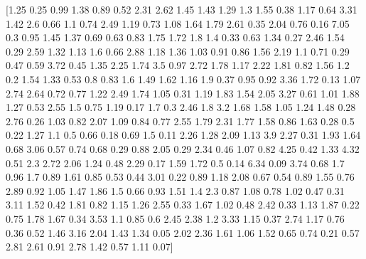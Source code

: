 \documentclass[preview]{standalone}
\begin{document}
\begin{center}
[1.25 0.25 0.99 1.38 0.89 0.52 2.31 2.62 1.45 1.43 1.29 1.3  1.55 0.38
 1.17 0.64 3.31 1.42 2.6  0.66 1.1  0.74 2.49 1.19 0.73 1.08 1.64 1.79
 2.61 0.35 2.04 0.76 0.16 7.05 0.3  0.95 1.45 1.37 0.69 0.63 0.83 1.75
 1.72 1.8  1.4  0.33 0.63 1.34 0.27 2.46 1.54 0.29 2.59 1.32 1.13 1.6
 0.66 2.88 1.18 1.36 1.03 0.91 0.86 1.56 2.19 1.1  0.71 0.29 0.47 0.59
 3.72 0.45 1.35 2.25 1.74 3.5  0.97 2.72 1.78 1.17 2.22 1.81 0.82 1.56
 1.2  0.2  1.54 1.33 0.53 0.8  0.83 1.6  1.49 1.62 1.16 1.9  0.37 0.95
 0.92 3.36 1.72 0.13 1.07 2.74 2.64 0.72 0.77 1.22 2.49 1.74 1.05 0.31
 1.19 1.83 1.54 2.05 3.27 0.61 1.01 1.88 1.27 0.53 2.55 1.5  0.75 1.19
 0.17 1.7  0.3  2.46 1.8  3.2  1.68 1.58 1.05 1.24 1.48 0.28 2.76 0.26
 1.03 0.82 2.07 1.09 0.84 0.77 2.55 1.79 2.31 1.77 1.58 0.86 1.63 0.28
 0.5  0.22 1.27 1.1  0.5  0.66 0.18 0.69 1.5  0.11 2.26 1.28 2.09 1.13
 3.9  2.27 0.31 1.93 1.64 0.68 3.06 0.57 0.74 0.68 0.29 0.88 2.05 0.29
 2.34 0.46 1.07 0.82 4.25 0.42 1.33 4.32 0.51 2.3  2.72 2.06 1.24 0.48
 2.29 0.17 1.59 1.72 0.5  0.14 6.34 0.09 3.74 0.68 1.7  0.96 1.7  0.89
 1.61 0.85 0.53 0.44 3.01 0.22 0.89 1.18 2.08 0.67 0.54 0.89 1.55 0.76
 2.89 0.92 1.05 1.47 1.86 1.5  0.66 0.93 1.51 1.4  2.3  0.87 1.08 0.78
 1.02 0.47 0.31 3.11 1.52 0.42 1.81 0.82 1.15 1.26 2.55 0.33 1.67 1.02
 0.48 2.42 0.33 1.13 1.87 0.22 0.75 1.78 1.67 0.34 3.53 1.1  0.85 0.6
 2.45 2.38 1.2  3.33 1.15 0.37 2.74 1.17 0.76 0.36 0.52 1.46 3.16 2.04
 1.43 1.34 0.05 2.02 2.36 1.61 1.06 1.52 0.65 0.74 0.21 0.57 2.81 2.61
 0.91 2.78 1.42 0.57 1.11 0.07]
\end{center}
\end{document}
